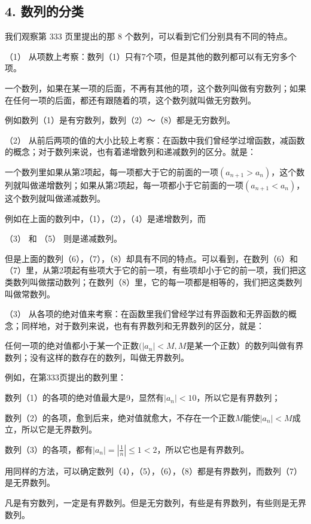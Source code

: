 \subsection{4. 数列的分类}

我们观察第 333 页里提出的那 8 个数列，可以看到它们分别具有不同的特点。

（1）
从项数上考察：数列（1）只有7个项，但是其他的数列都可以有无穷多个项。

一个数列，如果在某一项的后面，不再有其他的项，这个数列叫做有穷数列；如果在任何一项的后面，都还有跟随着的项，这个数列就叫做无穷数列。

例如数列（1）是有穷数列，数列（2）～（8）都是无穷数列。

（2）
从前后两项的值的大小比较上考察：在函数中我们曾经学过增函数，减函数的概念；对于数列来说，也有着递增数列和递减数列的区分。就是：

一个数列里如果从第2项起，每一项都大于它的前面的一项\((a_{n+1}>a_{n})\)，这个数列就叫做递增数列；如果从第2项起，每一项都小于它前面的一项\((a_{n+1}<a_{n})\)，这个数列就叫做递减数列。

例如在上面的数列中，（1），（2），（4）是递增数列，而

（3） 和 （5） 则是递减数列。

但是上面的数列（6），（7），（8）却具有不同的特点。可以看到，在数列（6）和（7）里，从第2项起有些项大于它的前一项，有些项却小于它的前一项，我们把这类数列叫做摆动数列；在数列（8）里，它的每一项都是相等的，我们把这类数列叫做常数列。

（3）
从各项的绝对值来考察：在函数里我们曾经学过有界函数和无界函数的概念；同样地，对于数列来说，也有有界数列和无界数列的区分，就是：

任何一项的绝对值都小于某一个正数\((|a_{n}|<M,M\)是某一个正数）的数列叫做有界数列；没有这样的数存在的数列，叫做无界数列。

例如，在第333页提出的数列里：

数列（1）的各项的绝对值最大是9，显然有\(|a_{n}|<10\)，所以它是有界数列；

数列（2）的各项，愈到后来，绝对值就愈大，不存在一个正数\(M\)能使\(\left|a_{n}\right| < M\)成立，所以它是无界数列。

数列（3）的各项，都有\(|a_{n}|=\left|\frac{1}{n}\right|\leqslant1<2\)，所以它也是有界数列。

用同样的方法，可以确定数列（4），（5），（6），（8）都是有界数列，而数列（7）是无界数列。

凡是有穷数列，一定是有界数列。但是无穷数列，有些是有界数列，有些则是无界数列。

